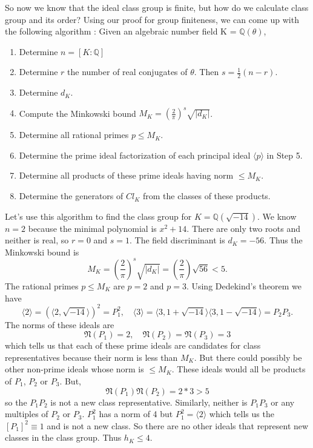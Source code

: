 \documentclass[12pt]{article}
\theoremstyle{definition}
\begin{document}
So now we know that the ideal class group is finite, but how do we calculate class group and its order? Using our proof for group finiteness, we can come up with the following algorithm \cite{Alaca_Williams_2003}:
Given an algebraic number field K = $\mathbb{Q}(\theta)$,
\begin{enumerate}
\item Determine $n=[K : \mathbb{Q}]$
\item Determine $r$ the number of real conjugates of $\theta$. Then $s = \frac{1}{2}(n-r)$.
\item Determine $d_K$.
\item Compute the Minkowski bound $M_K = (\frac{2}{\pi})^s \sqrt{|d_K|}$.
\item Determine all rational primes $p \leq M_K$.
\item Determine the prime ideal factorization of each principal ideal $\langle p \rangle$ in Step 5.
\item Determine all products of these prime ideals having norm $\leq M_K$.
\item Determine the generators of $Cl_K$ from the classes of these products.
\end{enumerate}

Let's use this algorithm to find the class group for $K=\mathbb{Q}(\sqrt{-14})$. We know $n=2$ because the minimal polynomial is $x^2 + 14$. There are only two roots and neither is real, so $r = 0$ and $s = 1$.
The field discriminant is $d_K = -56$. Thus the Minkowski bound is
\[M_K = (\frac{2}{\pi})^s \sqrt{|d_K|} = (\frac{2}{\pi})\sqrt{56} < 5.\]
The rational primes $p \leq M_K$ are $p=2$ and $p=3$. Using Dedekind's theorem we have
\[\langle 2 \rangle = (\langle 2, \sqrt{-14} \rangle)^2 = P_1^2, \quad \langle 3 \rangle = \langle 3, 1 +\sqrt{-14} \rangle \langle 3, 1 -\sqrt{-14} \rangle = P_2P_3.\]
The norms of these ideals are 
\[\mathfrak{N}(P_1) = 2, \quad \mathfrak{N}(P_2) = \mathfrak{N}(P_3) = 3 \]
which tells us that each of these prime ideals are candidates for class representatives because their norm is less than $M_K$. 
But there could possibly be other non-prime ideals whose norm is $\leq M_K$. These ideals would all be products of $P_1$, $P_2$ or $P_3$.
But,
\[\mathfrak{N}(P_1)\mathfrak{N}(P_2) = 2*3 > 5\]
so the $P_1P_2$ is not a new class representative. Similarly, neither is $P_1P_3$ or any multiples of $P_2$ or $P_3$. $P_1^2$ has a norm of 4 but 
$P_1^2 = \langle 2 \rangle$ which tells us the $[P_1]^2 \equiv 1$ and is not a new class. So there are no other ideals that represent new classes in the class group. Thus $h_K \leq 4$.
\end{document}
